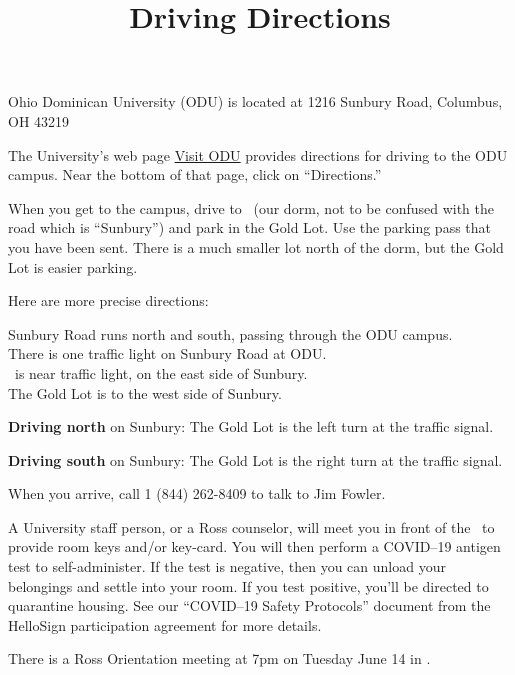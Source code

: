 \documentclass{ross}
\title{Driving Directions}
\newcommand{\spa}{\hspace*{1cm}}
\begin{document}
\maketitle

Ohio Dominican University (ODU) is located at 1216 Sunbury Road, Columbus, OH 43219

The University's web page 
\href{https://www.ohiodominican.edu/future-students/admissions-aid/visit-odu/locations}{Visit ODU}  provides directions for driving to the ODU campus.  Near the bottom of that page, click on ``Directions.''   

When you get to the campus, drive to \dormname\ (our dorm, not to be
confused with the road which is ``Sunbury'') and park in the Gold Lot.
Use the parking pass that you have been sent.  There is a much smaller
lot north of the dorm, but the Gold Lot is easier parking.

Here are more precise directions:

\spa Sunbury Road runs north and south, passing through the ODU campus.\\
\spa There is one traffic light on Sunbury Road at ODU. \\
\spa \dormname\ is near traffic light, on the east side of Sunbury. \\
\spa The Gold Lot is to the west side of Sunbury.
 
{\bf Driving north} on Sunbury: The Gold Lot is the left turn at the traffic signal.

{\bf Driving south} on Sunbury: The Gold Lot is the right turn at the traffic signal.

When you arrive, call 1 (844) 262-8409 to talk to Jim Fowler.

A University staff person, or a Ross counselor, will meet you in front
of the \dormname\ to provide room keys and/or key-card.  You will then
perform a COVID--19 antigen test to self-administer.  If the test is
negative, then you can unload your belongings and settle into your
room. If you test positive, you'll be directed to quarantine housing.
See our ``COVID--19 Safety Protocols'' document from the HelloSign
participation agreement for more details.

There is a Ross Orientation meeting at 7pm on Tuesday June 14 in
\orientationlocation.
\end{document}

